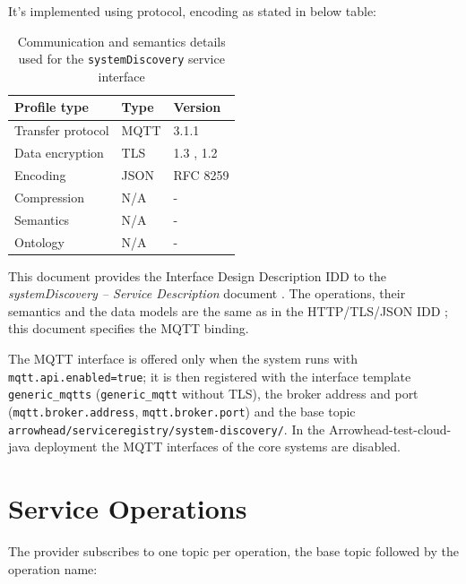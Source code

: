 \documentclass[a4paper]{arrowhead}
\begin{document}
It's implemented using protocol, encoding as stated in below table:
\begin{table}[ht!]
  \centering
  \begin{tabular}{|l|l|l|}
    \hline
    \rowcolor{gray!33} Profile type & Type & Version \\ \hline
    Transfer protocol & MQTT & 3.1.1 \cite{mqtt311} \\ \hline
    Data encryption & TLS & 1.3 \cite{rfc8446}, 1.2 \cite{rfc5246} \\ \hline
    Encoding & JSON & RFC 8259 \cite{rfc8259} \\ \hline
    Compression & N/A & - \\ \hline
    Semantics & N/A & - \\ \hline
    Ontology & N/A & - \\ \hline
  \end{tabular}
  \caption{Communication and semantics details used for the \texttt{systemDiscovery} service interface}
  \label{tab:comunication_semantics_profile}
\end{table}

This document provides the Interface Design Description IDD to the \textit{systemDiscovery -- Service Description} document \cite{sr-systemDiscovery-sd}.
The operations, their semantics and the data models are the same as in the HTTP/TLS/JSON IDD \cite{sr-systemDiscovery-http-idd}; this document specifies the MQTT binding.

The MQTT interface is offered only when the system runs with \texttt{mqtt.api.enabled=true}; it is then registered with the interface template \texttt{generic\_\allowbreak{}mqtts} (\texttt{generic\_\allowbreak{}mqtt} without TLS), the broker address and port (\texttt{mqtt.\allowbreak{}broker.\allowbreak{}address}, \texttt{mqtt.\allowbreak{}broker.\allowbreak{}port}) and the base topic \texttt{arrowhead/\allowbreak{}serviceregistry/\allowbreak{}system-\allowbreak{}discovery/\allowbreak{}}. In the Arrowhead-test-cloud-java deployment the MQTT interfaces of the core systems are disabled.

\newpage

\section{Service Operations}
\label{sec:operations}

The provider subscribes to one topic per operation, the base topic followed by the operation name:
\end{document}
